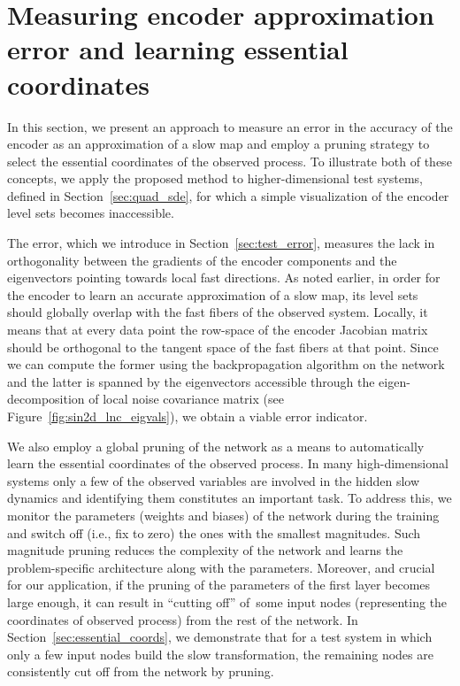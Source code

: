 \documentclass{article}
\begin{document}
\section{Measuring encoder approximation error and learning essential coordinates}\label{sec:error_prunning}
In this section, we present an approach to measure an error in the accuracy of the encoder as an approximation of a slow map and employ a pruning strategy to select the essential coordinates of the observed process. To illustrate both of these concepts, we apply the proposed method to higher-dimensional test systems, defined in Section~\ref{sec:quad_sde}, for which a simple visualization of the encoder level sets becomes inaccessible.

The error, which we introduce in Section~\ref{sec:test_error}, measures the lack in orthogonality between the gradients of the encoder components and the eigenvectors pointing towards local fast directions. As noted earlier, in order for the encoder to learn an accurate approximation of a slow map, its level sets should globally overlap with the fast fibers of the observed system. Locally, it means that at every data point the row-space of the encoder Jacobian matrix should be orthogonal to the tangent space of the fast fibers at that point. Since we can compute the former using the backpropagation algorithm on the network and the latter is spanned by the eigenvectors accessible through the eigen-decomposition of local noise covariance matrix (see Figure~\ref{fig:sin2d_lnc_eigvals}), we obtain a viable error indicator.

We also employ a global pruning of the network as a means to automatically learn the essential coordinates of the observed process. In many high-dimensional systems only a few of the observed variables are involved in the hidden slow dynamics and identifying them constitutes an important task. To address this, we monitor the parameters (weights and biases) of the network during the training and switch off (i.e., fix to zero) the ones with the smallest magnitudes. Such magnitude pruning reduces the complexity of the network and learns the problem-specific architecture along with the parameters. Moreover, and crucial for our application, if the pruning of the parameters of the first layer becomes large enough, it can result in ``cutting off'' of~some input nodes (representing the coordinates of observed process) from the rest of the network. In Section~\ref{sec:essential_coords}, we demonstrate that for a test system in which only a few input nodes build the slow transformation, the remaining nodes are consistently cut off from the network by pruning.
\end{document}
